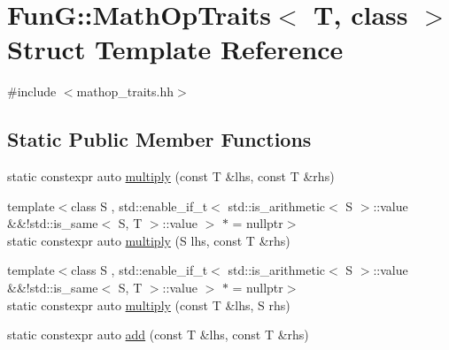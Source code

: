 \hypertarget{structFunG_1_1MathOpTraits}{\section{Fun\-G\-:\-:Math\-Op\-Traits$<$ T, class $>$ Struct Template Reference}
\label{structFunG_1_1MathOpTraits}
}


{\ttfamily \#include $<$mathop\-\_\-traits.\-hh$>$}

\subsection*{Static Public Member Functions}
\begin{DoxyCompactItemize}
\item 
static constexpr auto \hyperlink{structFunG_1_1MathOpTraits_aaba9ac52ae8670b1ad2cde0fd3dc4115}{multiply} (const T \&lhs, const T \&rhs)
\item 
{\footnotesize template$<$class S , std\-::enable\-\_\-if\-\_\-t$<$ std\-::is\-\_\-arithmetic$<$ S $>$\-::value \&\&!std\-::is\-\_\-same$<$ S, T $>$\-::value $>$ $\ast$  = nullptr$>$ }\\static constexpr auto \hyperlink{structFunG_1_1MathOpTraits_a9c07489a77b2fb146f8a46cc19defb02}{multiply} (S lhs, const T \&rhs)
\item 
{\footnotesize template$<$class S , std\-::enable\-\_\-if\-\_\-t$<$ std\-::is\-\_\-arithmetic$<$ S $>$\-::value \&\&!std\-::is\-\_\-same$<$ S, T $>$\-::value $>$ $\ast$  = nullptr$>$ }\\static constexpr auto \hyperlink{structFunG_1_1MathOpTraits_aa6cfac9c721a69624587ed2fc5bbcb30}{multiply} (const T \&lhs, S rhs)
\item 
static constexpr auto \hyperlink{structFunG_1_1MathOpTraits_a41f952d5f51ac17f9ed49218a6894605}{add} (const T \&lhs, const T \&rhs)
\end{DoxyCompactItemize}


